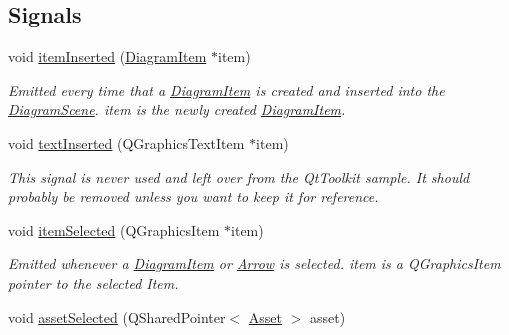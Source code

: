 \subsection*{Signals}
\begin{DoxyCompactItemize}
\item 
\hypertarget{class_diagram_scene_af831d659c3c3b3427a1376a738d27df1}{void \hyperlink{class_diagram_scene_af831d659c3c3b3427a1376a738d27df1}{item\-Inserted} (\hyperlink{class_diagram_item}{Diagram\-Item} $\ast$item)}\label{class_diagram_scene_af831d659c3c3b3427a1376a738d27df1}

\begin{DoxyCompactList}\small\item\em Emitted every time that a \hyperlink{class_diagram_item}{Diagram\-Item} is created and inserted into the \hyperlink{class_diagram_scene}{Diagram\-Scene}. item is the newly created \hyperlink{class_diagram_item}{Diagram\-Item}. \end{DoxyCompactList}\item 
\hypertarget{class_diagram_scene_abfeb12f9e0368690459884893109ce69}{void \hyperlink{class_diagram_scene_abfeb12f9e0368690459884893109ce69}{text\-Inserted} (Q\-Graphics\-Text\-Item $\ast$item)}\label{class_diagram_scene_abfeb12f9e0368690459884893109ce69}

\begin{DoxyCompactList}\small\item\em This signal is never used and left over from the Qt\-Toolkit sample. It should probably be removed unless you want to keep it for reference. \end{DoxyCompactList}\item 
\hypertarget{class_diagram_scene_aa0f1ec983181d9513829d99c0666e415}{void \hyperlink{class_diagram_scene_aa0f1ec983181d9513829d99c0666e415}{item\-Selected} (Q\-Graphics\-Item $\ast$item)}\label{class_diagram_scene_aa0f1ec983181d9513829d99c0666e415}

\begin{DoxyCompactList}\small\item\em Emitted whenever a \hyperlink{class_diagram_item}{Diagram\-Item} or \hyperlink{class_arrow}{Arrow} is selected. item is a Q\-Graphics\-Item pointer to the selected Item. \end{DoxyCompactList}\item 
\hypertarget{class_diagram_scene_ac13d67a0f03c7e5dab4723c20cc51f60}{void \hyperlink{class_diagram_scene_ac13d67a0f03c7e5dab4723c20cc51f60}{asset\-Selected} (Q\-Shared\-Pointer$<$ \hyperlink{class_picto_1_1_asset}{Asset} $>$ asset)}\label{class_diagram_scene_ac13d67a0f03c7e5dab4723c20cc51f60}


\end{DoxyCompactItemize}
